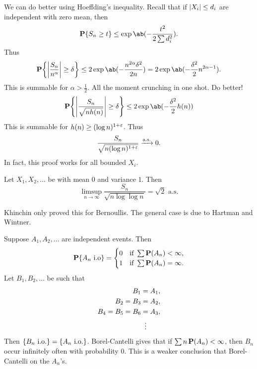 We can do better using Hoeffding's inequality.
Recall that if $\abs{X_i} \le d_i$ are independent with zero mean, then \[
    \P\set{S_n \ge t} \le \exp\ab(-\frac{t^2}{2 \sum d_i^2}).
\]
Thus \[
    \P\set*{\abs*{\frac{S_n}{n^\alpha}} \ge \delta}
        \le 2 \exp\ab(-\frac{n^{2\alpha} \delta^2}{2n})
        = 2 \exp\ab(-\frac{\delta^2}{2} n^{2\alpha - 1}).
\] This is summable for $\alpha > \frac12$.
All the moment crunching in one shot.
Do better!
\begin{align*}
    \P\set*{\abs*{\frac{S_n}{\sqrt{n h(n)}}} \ge \delta}
        &\le 2 \exp\ab(-\frac{\delta^2}{2} h(n)) \\
\end{align*}
This is summable for $h(n) \ge (\log n)^{1+\eps}$.
Thus \[
    \frac{S_n}{\sqrt{n (\log n)^{1+\eps}}} \asto 0.
\]
In fact, this proof works for all bounded $X_i$.

\begin{fact*} \label{thm:loglog}
    Let $X_1, X_2, \dots$ be \iid with mean $0$ and variance $1$.
    Then \[
        \limsup_{n\to\infty} \frac{S_n}{\sqrt{n \log\log n}} = \sqrt2
            \text{ a.s.}
    \]
\end{fact*}
\begin{remark}
    Khinchin only proved this for Bernoullis.
    The general case is due to Hartman and Wintner.
\end{remark}

Suppose $A_1, A_2, \dots$ are independent events.
Then \[
    \P\set{A_n \text{ i.o}} = \begin{cases}
        0 & \text{if } \sum \P(A_n) < \infty, \\
        1 & \text{if } \sum \P(A_n) = \infty.
    \end{cases}
\] Let $B_1, B_2, \dots$ be such that \begin{align*}
    B_1 &= A_1, \\
    B_2 = B_3 &= A_2, \\
    B_4 = B_5 = B_6 &= A_3, \\
    &\vdotswithin{=} \\
\end{align*}
Then $\set{B_n \text{ i.o.}} = \set{A_n \text{ i.o.}}$.
Borel-Cantelli gives that if $\sum n \P(A_n) < \infty$, then $B_n$ occur
infinitely often with probability $0$.
This is a weaker conclusion that Borel-Cantelli on the $A_n$'s.

